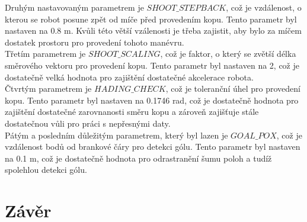 \documentclass[a4paper,12pt]{article}
\begin{document}
Druhým nastavovaným parametrem je $SHOOT\_STEPBACK$, což je vzdálenost, o kterou se robot posune zpět od míče před provedením kopu. Tento parametr byl nastaven na 0.8 m. Kvůli této větší vzálenosti je třeba zajistit, aby bylo za míčem dostatek prostoru pro provedení tohoto manévru.\\
Třetím parametrem je $SHOOT\_SCALING$, což je faktor, o který se zvětší délka směrového vektoru pro provedení kopu. Tento parametr byl nastaven na 2, což je dostatečně velká hodnota pro zajištění dostatečné akcelerace robota.\\
Čtvrtým parametrem je $HADING\_CHECK$, což je toleranční úhel pro provedení kopu. Tento parametr byl nastaven na 0.1746 rad, což je dostatečně hodnota pro zajištění dostatečné zarovnanosti směru kopu a zároveň zajišťuje stále dostatečnou vůli pro práci s nepřesnými daty.\\
Pátým a posledním důležitým parametrem, který byl lazen je $GOAL\_POX$, což je vzdálenost bodů od brankové čáry pro detekci gólu. Tento parametr byl nastaven na 0.1 m, což je dostatečně hodnota pro odrastranění šumu poloh a tudíž spolehlou detekci gólu.\\



\section{Závěr}
\end{document}
